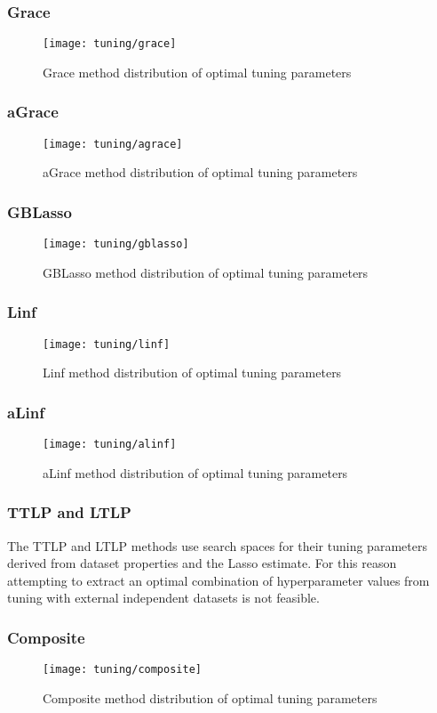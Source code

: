 \subsubsection{Grace}
\begin{figure}[H]
	\centering
	\texttt{[image: tuning/grace]}
	\caption{Grace method distribution of optimal tuning parameters}
	\label{fig:tun_grace}
\end{figure}

\subsubsection{aGrace}
\begin{figure}[H]
	\centering
	\texttt{[image: tuning/agrace]}
	\caption{aGrace method distribution of optimal tuning parameters}
	\label{fig:tun_agrace}
\end{figure}

\subsubsection{GBLasso}
\begin{figure}[H]
	\centering
	\texttt{[image: tuning/gblasso]}
	\caption{GBLasso method distribution of optimal tuning parameters}
	\label{fig:tun_gblasso}
\end{figure}

\subsubsection{Linf}
\begin{figure}[H]
	\centering
	\texttt{[image: tuning/linf]}
	\caption{Linf method distribution of optimal tuning parameters}
	\label{fig:tun_linf}
\end{figure}

\subsubsection{aLinf}
\begin{figure}[H]
	\centering
	\texttt{[image: tuning/alinf]}
	\caption{aLinf method distribution of optimal tuning parameters}
	\label{fig:tun_alinf}
\end{figure}

\subsubsection{TTLP and LTLP}
The TTLP and LTLP methods use search spaces for their tuning parameters derived from dataset properties and the Lasso estimate. For this reason attempting to extract an optimal combination of hyperparameter values from tuning with external independent datasets is not feasible. 

\subsubsection{Composite}
\begin{figure}[H]
	\centering
	\texttt{[image: tuning/composite]}
	\caption{Composite method distribution of optimal tuning parameters}
	\label{fig:tun_composite}
\end{figure}
